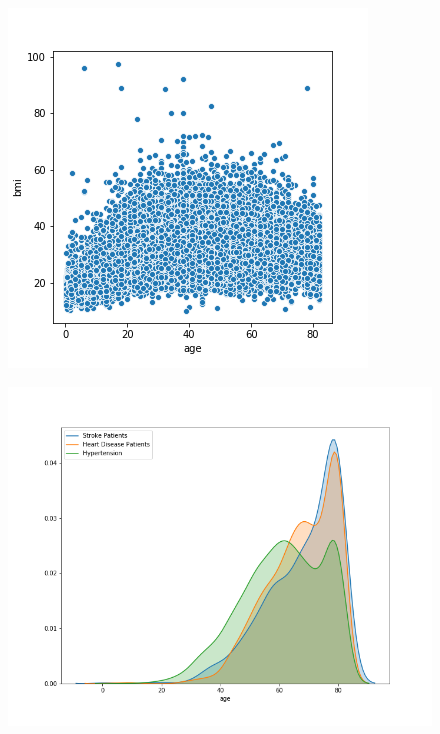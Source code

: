 \documentclass[proposal]{softeng}
\begin{document}
\begin{figure}
\centering
\begin{minipage}[t]{.4\textwidth}
  \centering
  \includegraphics[width=\textwidth]{images/building_ann/age_bmi_scatterplot.png}
  \label{fig:age_bmi_scatterplot}
\end{minipage}
\begin{minipage}[t]{.5\textwidth}
  \centering
  \includegraphics[width=\textwidth]{images/building_ann/stroke_age_distplot.png}
  \label{fig:age_of_stroke_patients}
\end{minipage}
\end{figure}
\end{document}
